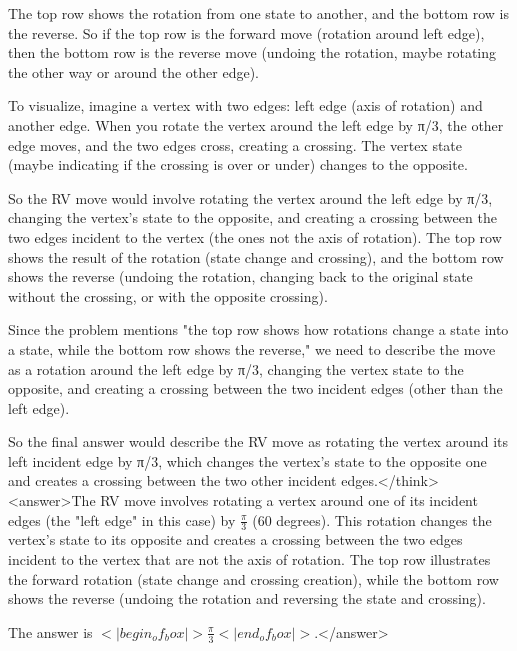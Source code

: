 The top row shows the rotation from one state to another, and the bottom row is the reverse. So if the top row is the forward move (rotation around left edge), then the bottom row is the reverse move (undoing the rotation, maybe rotating the other way or around the other edge). 

To visualize, imagine a vertex with two edges: left edge (axis of rotation) and another edge. When you rotate the vertex around the left edge by π/3, the other edge moves, and the two edges cross, creating a crossing. The vertex state (maybe indicating if the crossing is over or under) changes to the opposite. 

So the RV move would involve rotating the vertex around the left edge by π/3, changing the vertex's state to the opposite, and creating a crossing between the two edges incident to the vertex (the ones not the axis of rotation). The top row shows the result of the rotation (state change and crossing), and the bottom row shows the reverse (undoing the rotation, changing back to the original state without the crossing, or with the opposite crossing). 

Since the problem mentions "the top row shows how rotations change a state into a state, while the bottom row shows the reverse," we need to describe the move as a rotation around the left edge by π/3, changing the vertex state to the opposite, and creating a crossing between the two incident edges (other than the left edge). 

So the final answer would describe the RV move as rotating the vertex around its left incident edge by π/3, which changes the vertex's state to the opposite one and creates a crossing between the two other incident edges.</think><answer>The RV move involves rotating a vertex around one of its incident edges (the "left edge" in this case) by \( \frac{\pi}{3} \) (60 degrees). This rotation changes the vertex's state to its opposite and creates a crossing between the two edges incident to the vertex that are not the axis of rotation. The top row illustrates the forward rotation (state change and crossing creation), while the bottom row shows the reverse (undoing the rotation and reversing the state and crossing).  

The answer is \(<|begin_of_box|>\frac{\pi}{3}<|end_of_box|>\).</answer>